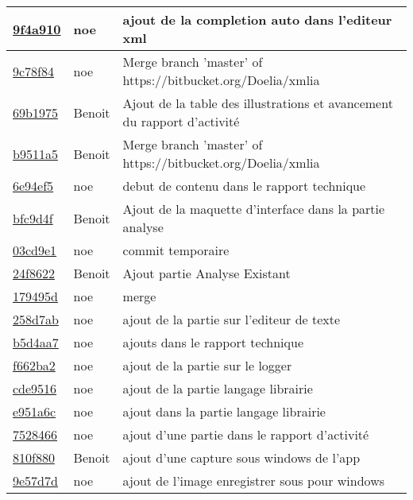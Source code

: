 \begin{tabular}{l l l}
\href{9f4a9106686199b3285bcaccb187a418a57b2d8e}{9f4a910} & noe & ajout de la completion auto dans l'editeur xml\\\hline
\href{9c78f84882e26e939442d42dead4bb95174a1f28}{9c78f84} & noe & Merge branch 'master' of https://bitbucket.org/Doelia/xmlia\\\hline
\href{69b197507a224c9b339398048dc47fd59c53d40d}{69b1975} & Benoit & Ajout de la table des illustrations et avancement du rapport d'activité\\\hline
\href{b9511a57cc0751dd4922b52cf1e73006088da2e6}{b9511a5} & Benoit & Merge branch 'master' of https://bitbucket.org/Doelia/xmlia\\\hline
\href{6e94ef5441c450b623e48f93f12f913297ca3a70}{6e94ef5} & noe & debut de contenu dans le rapport technique\\\hline
\href{bfc9d4f3b77a5813ba55723d680c0430e60ee3ad}{bfc9d4f} & Benoit & Ajout de la maquette d'interface dans la partie analyse\\\hline
\href{03cd9e1e259647f40dd7cc6720be07a267de6987}{03cd9e1} & noe & commit temporaire\\\hline
\href{24f862297b4712f623f264fad8e4f0d906cd1a64}{24f8622} & Benoit & Ajout partie Analyse Existant\\\hline
\href{179495d0f44e17d1440276b5910b0cf0f185786f}{179495d} & noe & merge\\\hline
\href{258d7ab632bd2ff511f0225f70828541f3413e1f}{258d7ab} & noe & ajout de la partie sur l'editeur de texte\\\hline
\href{b5d4aa73827c0e5af4dad9945c02d28dba51a926}{b5d4aa7} & noe & ajouts dans le rapport technique\\\hline
\href{f662ba27795396ac231104dcf5c559f8f41818a9}{f662ba2} & noe & ajout de la partie sur le logger\\\hline
\href{cde9516db9034ce25b8638cd5323093869715c67}{cde9516} & noe & ajout de la partie langage librairie\\\hline
\href{e951a6cbec61e88d6b30300c505fd875034b16f1}{e951a6c} & noe & ajout dans la partie langage librairie\\\hline
\href{7528466fa2e52cae799a8e05a992b6eadc3212a6}{7528466} & noe & ajout d'une partie dans le rapport d'activité\\\hline
\href{810f8802ad990c989132f420987dbf428c3b9197}{810f880} & Benoit & ajout d'une capture sous windows de l'app\\\hline
\href{9e57d7d3251f456873dad798529f827562765e29}{9e57d7d} & noe & ajout de l'image enregistrer sous pour windows\\\hline

\end{tabular}
